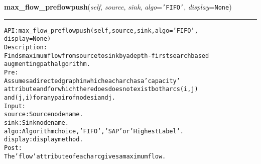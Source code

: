     \label{coinor:gimpy:graph:Graph:max_flow_preflowpush}

    \vspace{0.5ex}

\hspace{.8\funcindent}\begin{boxedminipage}{\funcwidth}

    \raggedright \textbf{max\_flow\_preflowpush}(\textit{self}, \textit{source}, \textit{sink}, \textit{algo}={\tt \texttt{'}\texttt{FIFO}\texttt{'}}, \textit{display}={\tt None})

    \vspace{-1.5ex}

    \rule{\textwidth}{0.5\fboxrule}
\setlength{\parskip}{2ex}
\begin{alltt}

API: max\_flow\_preflowpush(self, source, sink, algo = 'FIFO',
                          display = None)
Description:
Finds maximum flow from source to sink by a depth-first search based
augmenting path algorithm.
Pre:
     Assumes a directed graph in which each arc has a 'capacity'
     attribute and for which there does does not exist both arcs (i,j)
     and (j,i) for any pair of nodes i and j.
Input:
    source: Source node name.
    sink: Sink node name.
    algo: Algorithm choice, 'FIFO', 'SAP' or 'HighestLabel'.
    display: display method.
Post:
    The 'flow' attribute of each arc gives a maximum flow.
\end{alltt}

\setlength{\parskip}{1ex}
    \end{boxedminipage}

    \label{coinor:gimpy:graph:Graph:min_cost_flow}

    \vspace{0.5ex}

